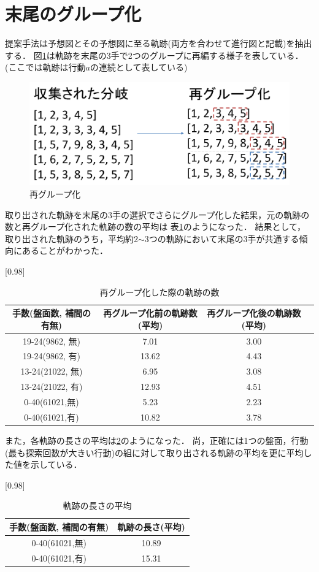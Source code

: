 \section{末尾のグループ化}
提案手法は予想図とその予想図に至る軌跡(両方を合わせて進行図と記載)を抽出する．
図\ref{fig:regroup}は軌跡を末尾の3手で2つのグループに再編する様子を表している．(ここでは軌跡は行動$a$の連続として表している)
\begin{figure}[htbp]
	\centering
	\includegraphics[width=\linewidth]{./figure/regroup.pdf}
	\caption{再グループ化}
	\label{fig:regroup}
\end{figure}
取り出された軌跡を末尾の3手の選択でさらにグループ化した結果，元の軌跡の数と再グループ化された軌跡の数の平均は
表\ref{table:tail}のようになった．
結果として，取り出された軌跡のうち，平均約2$\sim$3つの軌跡において末尾の3手が共通する傾向にあることがわかった．
\begin{table}[H]
	\caption{再グループ化した際の軌跡の数}
    \scriptsize
    \label{table:tail}
	\centering
	\scalebox{0.98}[0.98]{
		\begin{tabular}{c|c|c||c}
			手数(盤面数, 補間の有無)&  再グループ化前の軌跡数(平均)&  再グループ化後の軌跡数(平均)\\ \hline
			19-24(9862, 無)    & 7.01 & 3.00  \\
			19-24(9862, 有)    & 13.62 & 4.43  \\
			13-24(21022, 無)   &  6.95& 3.08  \\
			13-24(21022, 有)   & 12.93 & 4.51 \\
		    0-40(61021,無)& 5.23 & 2.23\\
		    0-40(61021,有)& 10.82 & 3.78\\
		\end{tabular}
	}

	
\end{table}
また，各軌跡の長さの平均は\ref{fig:length}のようになった．
尚，正確には1つの盤面，行動(最も探索回数が大きい行動)の組に対して取り出される軌跡の平均を更に平均した値を示している．
\begin{table}[H]
	\caption{軌跡の長さの平均}
    \scriptsize
    \label{fig:length}
	\centering
	\scalebox{0.98}[0.98]{
		\begin{tabular}{c|c}
			手数(盤面数, 補間の有無)&  軌跡の長さ(平均)\\ \hline
		    0-40(61021,無)& 10.89\\
		    0-40(61021,有)& 15.31\\
		\end{tabular}
	}	
\end{table}

